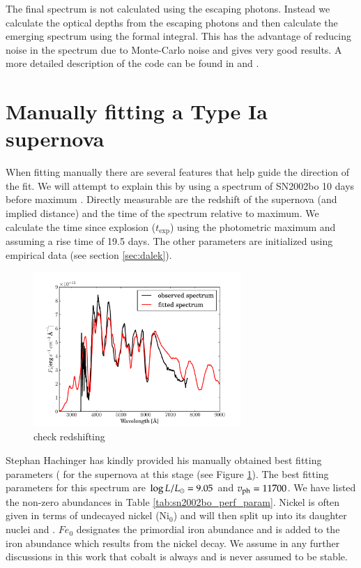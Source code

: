 The final spectrum is not calculated using the escaping photons. Instead we calculate the optical depths from the escaping photons and then calculate the emerging spectrum using the formal integral. 
This has the advantage of reducing noise in the spectrum due to Monte-Carlo noise and gives very good results. A more detailed description of the code can be found in  \citet{1993A&A...279..447M} and \citet{2000A&A...363..705M}.


\section{Manually fitting a Type Ia supernova}
\label{sec:manual_sneia}
When fitting manually there are several features that help guide the direction of the fit. We will attempt to explain this by using a spectrum of SN2002bo 10 days before maximum \citep{2004MNRAS.348..261B}. 
Directly measurable are the redshift of the supernova (and implied distance) and the time of the spectrum relative to maximum. We calculate the time since explosion ($t_\textrm{exp}$) using the photometric maximum and assuming a rise time of 19.5 days.
The other parameters are initialized using empirical data (see section \ref{sec:dalek}). 

\begin{figure}[htbp] %
   \centering
   \includegraphics[width=0.7\textwidth]{chapter_dalek/plots/bf2002bo-10.pdf} 
   \caption{check redshifting}
   \label{fig:sn2002bo-10_bf}
\end{figure}

Stephan Hachinger has kindly provided his manually obtained best fitting parameters ( for the supernova at this stage (see Figure \ref{fig:sn2002bo-10_bf}).
The best fitting parameters for this spectrum are $\log{L/L_\odot}=9.05$ and $v_{\rm ph}=11700$. We have listed the non-zero abundances in Table \ref{tab:sn2002bo_perf_param}. Nickel is often given in terms of undecayed nickel ($\textrm{Ni}_0$) and will then split up into its daughter nuclei \Co and \Fe. $Fe_0$ designates the primordial iron abundance and is added to the iron abundance which results from the  nickel decay. We assume in any further discussions in this work that cobalt is always \Co and is never assumed to be stable. 

